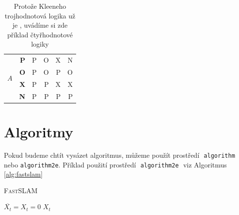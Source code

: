 \documentclass[a4paper, titlepage, 11pt]{article}
\begin{document}
\begin{table}[h]
\begin{tabular}[p]{|c|r|r|r|r|r|}
    \hline
    \multirow{4}{*}{$A$}  & \textbf{P}                  & P                           & O                & X                & N\\
    \cline{2-6}
                          & \textbf{O}                  & P                           & O                & P                & O\\
    \cline{2-6}
                          & \textbf{X}                  & P                           & P                & X                & X\\
    \cline{2-6}
                          & \textbf{N}                  & P                           & P                & P                & P\\
    \hline
  \end{tabular}


  \caption{Protože Kleeneho trojhodnotová logika už je , uvádíme si zde příklad čtyřhodnotové logiky}
  \label{tab:logic}
\end{table}
\bigskip
{}
\pagebreak

\section{Algoritmy}
\label{sec:alg}
Pokud budeme chtít vysázet algoritmus, můžeme použít prostředí\,\, \verb|algorithm|\footnotemark[2]\,\, nebo \verb|algorithm2e|\footnotemark[3]. Příklad použití prostředí\,\, \verb|algorithm2e|\,\, viz Algoritmus \ref{alg:fastslam}
\bigskip
\begin{algorithm}
  \label{alg:fastslam}
  \DontPrintSemicolon
  \caption{\textsc{Fast}SLAM}

  \BlankLine
  \SetNlSty{}{}{:}
  \SetNlSkip{-1em}

  \Indp \Indp

  $\overline{X_t} = X_t = 0$\;
  \Return $X_t$
\end{algorithm}
\end{document}
